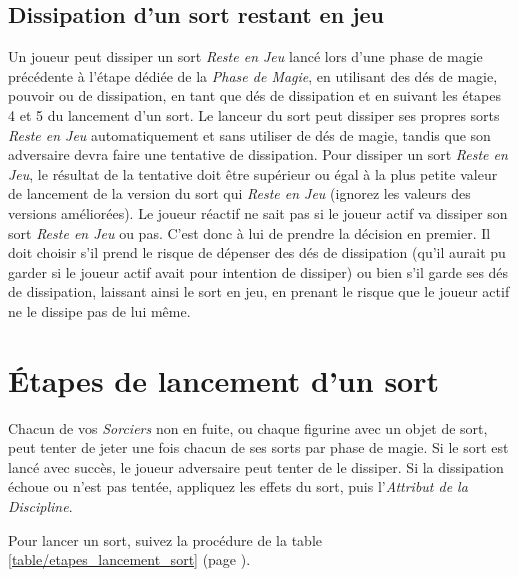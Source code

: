 \subsection{Dissipation d'un sort restant en jeu}

Un joueur peut dissiper un sort \emph{Reste en Jeu} lancé lors d'une phase de magie précédente à l'étape dédiée de la \emph{Phase de Magie}, en utilisant des dés de magie, pouvoir ou de dissipation, en tant que dés de dissipation et en suivant les étapes 4 et 5 du lancement d'un sort. Le lanceur du sort peut dissiper ses propres sorts \emph{Reste en Jeu} automatiquement et sans utiliser de dés de magie, tandis que son adversaire devra faire une tentative de dissipation. Pour dissiper un sort \emph{Reste en Jeu}, le résultat de la tentative doit être supérieur ou égal à la plus petite valeur de lancement de la version du sort qui \emph{Reste en Jeu} (ignorez les valeurs des versions améliorées). 
Le joueur réactif ne sait pas si le joueur actif va dissiper son sort \emph{Reste en Jeu} ou pas. C'est donc à lui de prendre la décision en premier. Il doit choisir s'il prend le risque de dépenser des dés de dissipation (qu'il aurait pu garder si le joueur actif avait pour intention de dissiper) ou bien s'il garde ses dés de dissipation, laissant ainsi le sort en jeu, en prenant le risque que le joueur actif ne le dissipe pas de lui même.


\section{Étapes de lancement d'un sort}
\label{lancement_sort}

Chacun de vos \emph{Sorciers} non en fuite, ou chaque figurine avec un objet de sort, peut tenter de jeter une fois chacun de ses sorts par phase de magie. Si le sort est lancé avec succès, le joueur adversaire peut tenter de le dissiper. Si la dissipation échoue ou n'est pas tentée, appliquez les effets du sort, puis l'\emph{Attribut de la Discipline}.

Pour lancer un sort, suivez la procédure de la table \ref{table/etapes_lancement_sort} (page \pageref{table/etapes_lancement_sort}).

